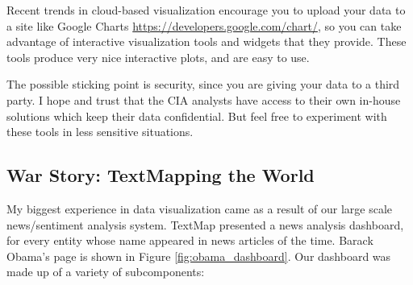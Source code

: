 \documentclass[10pt]{article}
\begin{document}

Recent trends in cloud-based visualization encourage you to upload your data to a site like Google Charts \url{https://developers.google.com/chart/}, so you can take advantage of interactive visualization tools and widgets that they provide. These tools produce very nice interactive plots, and are easy to use.

The possible sticking point is security, since you are giving your data to a third party. I hope and trust that the CIA analysts have access to their own in-house solutions which keep their data confidential. But feel free to experiment with these tools in less sensitive situations.

\subsection{War Story: TextMapping the World}
My biggest experience in data visualization came as a result of our large scale news/sentiment analysis system. TextMap presented a news analysis dashboard, for every entity whose name appeared in news articles of the time. Barack Obama's page is shown in Figure \ref{fig:obama_dashboard}. Our dashboard was made up of a variety of subcomponents:
\end{document}
